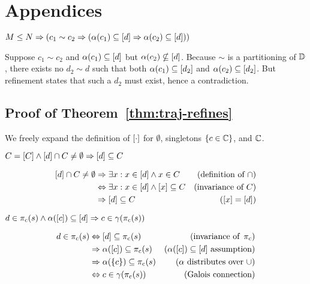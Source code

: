 \section{Appendices}

\begin{lemma} \label{lem:class-unique}
$M \leq N \Rightarrow (c_{1} \sim c_{2} \Rightarrow (\alpha(c_{1}) \subseteq [d] \Rightarrow \alpha(c_{2}) \subseteq [d]))$
\end{lemma}

Suppose $c_{1} \sim c_{2}$ and $\alpha(c_{1}) \subseteq [d]$ but $\alpha(c_{2}) \nsubseteq [d]$. Because $\sim$ is a partitioning of $\mathbb{D}$, there exists no $d_{2} \sim d$ such that both $\alpha(c_{1}) \subseteq [d_{2}]$ and $\alpha(c_{2}) \subseteq [d_{2}]$. But refinement states that such a $d_{2}$ must exist, hence a contradiction.

\subsection{Proof of Theorem~\ref{thm:traj-refines}}

We freely expand the definition of $[\cdot]$ for $\emptyset$, singletons $\{ c \in \mathbb{C} \}$, and $\mathbb{C}$.

\begin{lemma} \label{lem:class-sub}
$C = [C] \wedge [d] \cap C \neq \emptyset \Rightarrow [d] \subseteq C$
\end{lemma}%
%
\begin{align*}
[d] \cap C \neq \emptyset & \Rightarrow \exists x : x \in [d] \wedge x \in C             & (\textrm{definition of } \cap) \\
                              & \Leftrightarrow     \exists x : x \in [d] \wedge [x] \subseteq C & (\textrm{invariance of } C) \\
                              & \Rightarrow [d] \subseteq C                                  & ([x] = [d])
\end{align*}

\begin{lemma} \label{lem:traj-con}
$d \in \operatorname{\pi_{\textrm{c}}}(s) \wedge \alpha([c]) \subseteq [d] \Rightarrow c \in \gamma(\operatorname{\pi_{\textrm{c}}}(s))$
\end{lemma}%
%
\begin{align*}
d \in \operatorname{\pi_{\textrm{c}}}(s) & \Leftrightarrow     [d] \subseteq \operatorname{\pi_{\textrm{c}}}(s)         & (\textrm{invariance of } \operatorname{\pi_{\textrm{c}}}) \\
                     & \Rightarrow \alpha([c]) \subseteq \operatorname{\pi_{\textrm{c}}}(s) & (\alpha([c]) \subseteq [d] \textrm{ assumption}) \\
                     & \Rightarrow \alpha(\{ c \}) \subseteq \operatorname{\pi_{\textrm{c}}}(s) & (\alpha \textrm{ distributes over } \cup) \\
                     & \Leftrightarrow     c \in \gamma(\operatorname{\pi_{\textrm{c}}}(s))             & (\textrm{Galois connection})
\end{align*}

